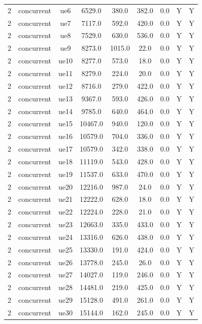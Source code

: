 \begin{table}[ht]
\begin{tabular}{|c|c|c|c|c|c|c|c|c|}
2 & concurrent & ue6 & 6529.0 & 380.0 & 382.0 & 0.0 & Y & Y \\
2 & concurrent & ue7 & 7117.0 & 592.0 & 420.0 & 0.0 & Y & Y \\
2 & concurrent & ue8 & 7529.0 & 630.0 & 536.0 & 0.0 & Y & Y \\
2 & concurrent & ue9 & 8273.0 & 1015.0 & 22.0 & 0.0 & Y & Y \\
2 & concurrent & ue10 & 8277.0 & 573.0 & 18.0 & 0.0 & Y & Y \\
2 & concurrent & ue11 & 8279.0 & 224.0 & 20.0 & 0.0 & Y & Y \\
2 & concurrent & ue12 & 8716.0 & 279.0 & 422.0 & 0.0 & Y & Y \\
2 & concurrent & ue13 & 9367.0 & 593.0 & 426.0 & 0.0 & Y & Y \\
2 & concurrent & ue14 & 9785.0 & 640.0 & 464.0 & 0.0 & Y & Y \\
2 & concurrent & ue15 & 10467.0 & 940.0 & 120.0 & 0.0 & Y & Y \\
2 & concurrent & ue16 & 10579.0 & 704.0 & 336.0 & 0.0 & Y & Y \\
2 & concurrent & ue17 & 10579.0 & 342.0 & 338.0 & 0.0 & Y & Y \\
2 & concurrent & ue18 & 11119.0 & 543.0 & 428.0 & 0.0 & Y & Y \\
2 & concurrent & ue19 & 11537.0 & 633.0 & 470.0 & 0.0 & Y & Y \\
2 & concurrent & ue20 & 12216.0 & 987.0 & 24.0 & 0.0 & Y & Y \\
2 & concurrent & ue21 & 12222.0 & 628.0 & 18.0 & 0.0 & Y & Y \\
2 & concurrent & ue22 & 12224.0 & 228.0 & 21.0 & 0.0 & Y & Y \\
2 & concurrent & ue23 & 12663.0 & 335.0 & 433.0 & 0.0 & Y & Y \\
2 & concurrent & ue24 & 13316.0 & 626.0 & 438.0 & 0.0 & Y & Y \\
2 & concurrent & ue25 & 13330.0 & 191.0 & 424.0 & 0.0 & Y & Y \\
2 & concurrent & ue26 & 13778.0 & 245.0 & 26.0 & 0.0 & Y & Y \\
2 & concurrent & ue27 & 14027.0 & 119.0 & 246.0 & 0.0 & Y & Y \\
2 & concurrent & ue28 & 14481.0 & 219.0 & 425.0 & 0.0 & Y & Y \\
2 & concurrent & ue29 & 15128.0 & 491.0 & 261.0 & 0.0 & Y & Y \\
2 & concurrent & ue30 & 15144.0 & 162.0 & 245.0 & 0.0 & Y & Y \\

\end{tabular}
\end{table}
